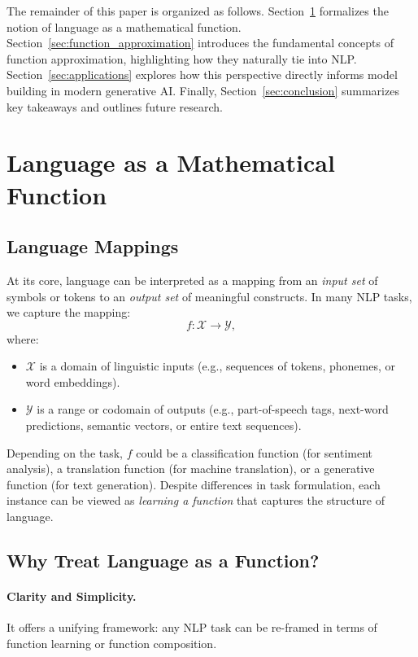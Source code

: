 \documentclass[11pt]{article}
\begin{document}
The remainder of this paper is organized as follows. Section~\ref{sec:lang_as_function} formalizes the notion of language as a mathematical function. Section~\ref{sec:function_approximation} introduces the fundamental concepts of function approximation, highlighting how they naturally tie into NLP. Section~\ref{sec:applications} explores how this perspective directly informs model building in modern generative AI. Finally, Section~\ref{sec:conclusion} summarizes key takeaways and outlines future research.

\section{Language as a Mathematical Function}
\label{sec:lang_as_function}

\subsection{Language Mappings}
At its core, language can be interpreted as a mapping from an \emph{input set} of symbols or tokens to an \emph{output set} of meaningful constructs. In many NLP tasks, we capture the mapping:
\[
f: \mathcal{X} \rightarrow \mathcal{Y},
\]
where:
\begin{itemize}
    \item $\mathcal{X}$ is a domain of linguistic inputs (e.g., sequences of tokens, phonemes, or word embeddings).
    \item $\mathcal{Y}$ is a range or codomain of outputs (e.g., part-of-speech tags, next-word predictions, semantic vectors, or entire text sequences).
\end{itemize}
Depending on the task, $f$ could be a classification function (for sentiment analysis), a translation function (for machine translation), or a generative function (for text generation). Despite differences in task formulation, each instance can be viewed as \emph{learning a function} that captures the structure of language.

\subsection{Why Treat Language as a Function?}
\paragraph{Clarity and Simplicity.} It offers a unifying framework: any NLP task can be re-framed in terms of function learning or function composition.
\end{document}
